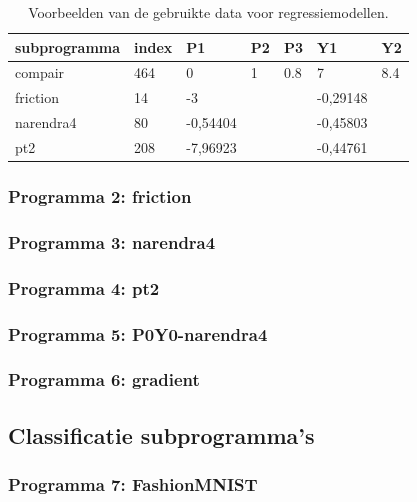 			\begin{table}[]
				
				\centering
				\begin{tabular}{@{}lllllll@{}}
					\toprule
					subprogramma                   & index & P1       & P2 & P3  & Y1       & Y2  \\ \midrule
					\multicolumn{1}{l|}{compair}   & 464   & 0        & 1  & 0.8 & 7        & 8.4 \\
					\multicolumn{1}{l|}{friction}  & 14    & -3       &    &     & -0,29148 &     \\
					\multicolumn{1}{l|}{narendra4} & 80    & -0,54404 &    &     & -0,45803 &     \\
					\multicolumn{1}{l|}{pt2}       & 208   & -7,96923 &    &     & -0,44761 &     \\ \bottomrule
				\end{tabular}
				\label{Tab:dataVoorbeelden}
				\caption{Voorbeelden van de gebruikte data voor regressiemodellen.}
			\end{table}

		\subsubsection{Programma 2: friction}
		\subsubsection{Programma 3: narendra4}
		\subsubsection{Programma 4: pt2}
		\subsubsection{Programma 5: P0Y0-narendra4}
		\subsubsection{Programma 6: gradient}
		
		
	\subsection{Classificatie subprogramma's}
		\subsubsection{Programma 7: FashionMNIST}

